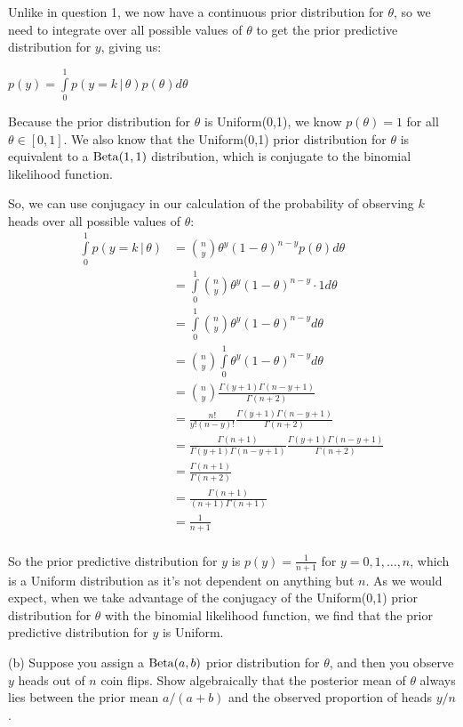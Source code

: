 \documentclass[12pt]{article}
\begin{document}
Unlike in question 1, we now have a continuous prior distribution for $\theta$, so we need to integrate
over all possible values of $\theta$ to get the prior predictive distribution for $y$, giving us:

$p(y) = \int\limits_0^1 p(y = k \, | \, \theta)p(\theta)d\theta$

Because the prior distribution for $\theta$ is Uniform(0,1), we know $p(\theta) = 1$ for all $\theta \in [0,1]$.
We also know that the Uniform(0,1) prior distribution for $\theta$ is equivalent to a ${\rm Beta}(1,1)$ distribution,
which is conjugate to the binomial likelihood function.

So, we can use conjugacy in our calculation of the probability of observing $k$ heads over all possible values of $\theta$:
\begin{align*}
\int\limits_0^1 p(y = k \, | \, \theta) &= \binom{n}{y}\theta^y\left(1 - \theta\right)^{n-y} p(\theta) d\theta \\
&= \int\limits_0^1 \binom{n}{y}\theta^y\left(1 - \theta\right)^{n-y} \cdot 1 d\theta \\
&= \int\limits_0^1 \binom{n}{y}\theta^y\left(1 - \theta\right)^{n-y}d\theta \\
&= \binom{n}{y} \int\limits_0^1 \theta^y\left(1 - \theta\right)^{n-y}d\theta \\
&= \binom{n}{y} \frac{\Gamma(y + 1) \Gamma(n - y + 1)}{\Gamma(n + 2)} \\
&= \frac{n!}{y!\left(n-y\right)!} \frac{\Gamma(y + 1) \Gamma(n - y + 1)}{\Gamma(n + 2)} \\
&= \frac{\Gamma(n+1)}{\Gamma(y+1)\Gamma(n-y+1)} \frac{\Gamma(y + 1) \Gamma(n - y + 1)}{\Gamma(n + 2)} \\
&= \frac{\Gamma(n+1)}{\Gamma(n + 2)} \\
&= \frac{\Gamma(n+1)}{(n + 1)\Gamma(n + 1)} \\
&= \frac{1}{n + 1} \\
\end{align*}

So the prior predictive distribution for $y$ is $p(y) = \frac{1}{n + 1}$ for $y = 0,1,\ldots,n$, which is a Uniform distribution as it's not dependent on anything but $n$. As we would expect, when we take advantage of the conjugacy of the Uniform(0,1) prior distribution for $\theta$ with the binomial likelihood function,
we find that the prior predictive distribution for $y$ is Uniform.

(b) Suppose you assign a ${\rm Beta}(a, b)$ prior distribution for $\theta$, and then you observe $y
$ heads out of $n$ coin flips.  Show algebraically that the posterior mean of $\theta$ always lies between the prior mean $a/(a+b)$ and the observed proportion of heads $y/n$.
\end{document}
